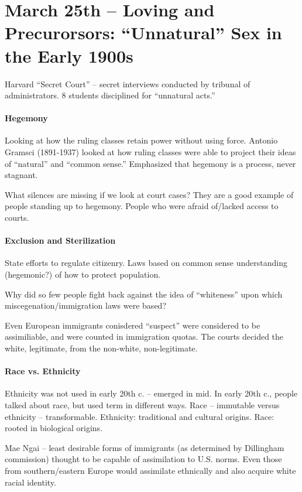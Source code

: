 \section{March 25th -- Loving and Precurorsors: ``Unnatural'' Sex in the Early 1900s}

Harvard ``Secret Court'' -- secret interviews conducted by tribunal of administrators. 8 students disciplined for ``unnatural acts.''

\paragraph{Hegemony} Looking at how the ruling classes retain power without using force. Antonio Gramsci (1891-1937) looked at how ruling classes were able to project their ideas of ``natural'' and ``common sense.'' Emphasized that hegemony is a process, never stagnant.

What silences are missing if we look at court cases? They are a good example of people standing up to hegemony. People who were afraid of/lacked access to courts.

\paragraph{Exclusion and Sterilization} State efforts to regulate citizenry. Laws based on common sense understanding (hegemonic?) of how to protect population.

Why did so few people fight back against the idea of ``whiteness'' upon which miscegenation/immigration laws were based?

Even European immigrants conisdered ``suspect'' were considered to be assimiliable, and were counted in immigration quotas. The courts decided the white, legitimate, from the non-white, non-legitimate.

\paragraph{Race vs. Ethnicity} Ethnicity was not used in early 20th c. -- emerged in mid. In early 20th c., people talked about race, but used term in different ways. Race -- immutable versus ethnicity -- transformable. Ethnicity: traditional and cultural origins. Race: rooted in biological origins.

Mae Ngai -- least desirable forms of immigrants (as determined by Dillingham commission) thought to be capable of assimilation to U.S. norms. Even those from southern/eastern Europe would assimilate ethnically and also acquire white racial identity.

